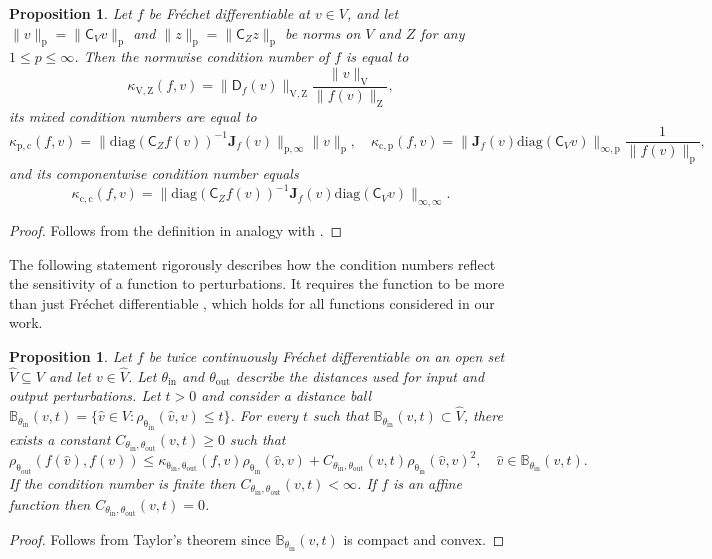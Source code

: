 \documentclass[namedate,webpdf,imanum]{ima-authoring-template}
\newcommand{\Matrix}[1]{\mathbf{#1}}
\newcommand{\diag}[2][]{\mathrm{diag}#1( #2 #1)}
\newcommand{\Norm}[3][]{#1\| #2 #1\|_{\mathrm{#3}}}
\newcommand{\Layer}[1]{\mathsf{#1}}
\newcommand{\dist}[3][]{\rho_{\mathrm{#2}} #1( #3 #1)}
\newcommand{\cond}[3][]{\kappa_{\mathrm{#2}} #1( #3 #1)}
\newcommand{\set}[3][]{#1\{ #2 : #3 #1\}}
\newtheorem{proposition}[theorem]{Proposition}%
\numberwithin{equation}{section}
\begin{document}
\begin{proposition}
\label{proposition:condition_numbers}
Let $f$ be Fr\'echet differentiable at $v \in V$, and let $\Norm{v}{p} = \Norm{\Layer{C}_V v}{p}$ and $\Norm{z}{p} = \Norm{\Layer{C}_Z z}{p}$ be norms on $V$ and $Z$ for any $1 \leq p \leq \infty$.
Then the normwise condition number of $f$ is equal to
\begin{equation*}
    \cond{V,Z}{f,v} = \Norm{\Layer{D}_f(v)}{V,Z} \frac{\Norm{v}{V}}{\Norm{f(v)}{Z}},
\end{equation*}
its mixed condition numbers are equal to
\begin{equation*}
    \cond{p,c}{f,v} = \Norm{\diag{\Layer{C}_Z f(v)}^{-1} \Matrix{J}_f(v)}{p,\infty} \Norm{v}{p}, \quad
    \cond{c,p}{f,v} = \Norm{\Matrix{J}_f(v) \diag{\Layer{C}_V v}}{\infty,p} \frac{1}{\Norm{f(v)}{p}},
\end{equation*}
and its componentwise condition number equals 
\begin{equation*}
    \cond{c,c}{f,v} = \Norm{\diag{\Layer{C}_Z f(v)}^{-1} \Matrix{J}_f(v) \diag{\Layer{C}_V v}}{\infty,\infty}.
\end{equation*}
\end{proposition}
\begin{proof}
Follows from the definition in analogy with \cite{rice1966theory, gohberg1993mixed}.
\end{proof}

The following statement rigorously describes how the condition numbers reflect the sensitivity of a function to perturbations.
It requires the function to be more than just Fr\'echet differentiable \citep[\S4.2]{zeidler1995applied}, which holds for all functions considered in our work.

\begin{proposition}
\label{proposition:sensitivity_bound}
Let $f$ be twice continuously Fr\'echet differentiable on an open set $\hat{V} \subseteq V$ and let $v \in \hat{V}$.
Let $\theta_{\mathrm{in}}$ and $\theta_{\mathrm{out}}$ describe the distances used for input and output perturbations.
Let $t > 0$ and consider a distance ball $\mathbb{B}_{\theta_{\mathrm{in}}}(v, t) = \set{\hat{v} \in V}{\dist{\theta_{in}}{\hat{v}, v} \leq t}$.
For every $t$ such that $\mathbb{B}_{\theta_{\mathrm{in}}}(v, t) \subset \hat{V}$, there exists a constant $C_{\theta_{\mathrm{in}}, \theta_{\mathrm{out}}}(v, t) \geq 0$ such that
\begin{equation*}
    \dist{\theta_{out}}{f(\hat{v}), f(v)} \leq \cond{\theta_{in}, \theta_{out}}{f,v} \dist{\theta_{in}}{\hat{v},v} + C_{\theta_{\mathrm{in}}, \theta_{\mathrm{out}}}(v, t) \dist{\theta_{in}}{\hat{v},v}^2, \quad \hat{v} \in \mathbb{B}_{\theta_{\mathrm{in}}}(v, t).
\end{equation*}
If the condition number is finite then $C_{\theta_{\mathrm{in}}, \theta_{\mathrm{out}}}(v, t) < \infty$.
If $f$ is an affine function then $C_{\theta_{\mathrm{in}}, \theta_{\mathrm{out}}}(v, t) = 0$.
\end{proposition}
\begin{proof}
Follows from Taylor's theorem \citep[\S4.5]{zeidler1995applied} since $\mathbb{B}_{\theta_{\mathrm{in}}}(v, t)$ is compact and convex.
\end{proof}
\end{document}
